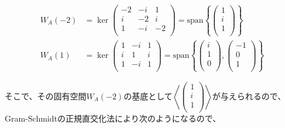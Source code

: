 \documentclass[dvipdfmx]{jsarticle}
\begin{document}
\begin{align*}
W_{A}( - 2) &= \ker\begin{pmatrix}
 - 2 & - i & 1 \\
i & - 2 & i \\
1 & - i & - 2 \\
\end{pmatrix} = {\mathrm{span}}\left\{ \begin{pmatrix}
1 \\
i \\
1 \\
\end{pmatrix} \right\}\\
W_{A}(1) &= \ker\begin{pmatrix}
1 & - i & 1 \\
i & 1 & i \\
1 & - i & 1 \\
\end{pmatrix} = {\mathrm{span}}\left\{ \begin{pmatrix}
i \\
1 \\
0 \\
\end{pmatrix},\begin{pmatrix}
 - 1 \\
0 \\
1 \\
\end{pmatrix} \right\}
\end{align*}\par
そこで、その固有空間$W_{A}( - 2)$の基底として$\left\langle \begin{pmatrix}
1 \\
i \\
1 \\
\end{pmatrix} \right\rangle$が与えられるので、Gram-Schmidtの正規直交化法により次のようになるので、
\end{document}
